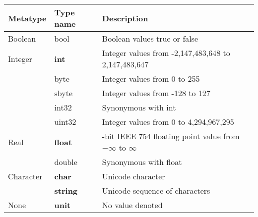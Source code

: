 \begin{table}
  \centering
  \begin{tabularx}{\textwidth}{|l|l|>{\raggedright\arraybackslash}X|}
    \hline
    Metatype & Type name & Description\\
    \hline
    Boolean & bool & Boolean values true or false \\
    \hline
    Integer & \textbf{int} & Integer values from -2,147,483,648 to 2,147,483,647 \\
             & byte &Integer values from 0 to 255\\
             & sbyte &Integer values from -128 to 127\\
             & int32 &Synonymous with int\\
             & uint32 & Integer values from 0 to 4,294,967,295\\
    \hline
    Real &\textbf{float} & 64-bit IEEE 754 floating point value from $-\infty$ to $\infty$\\
             & double & Synonymous with float\\
    \hline
    Character &\textbf{char} &Unicode character\\
             &\textbf{string} & Unicode sequence of characters\\
    \hline
    None &\textbf{unit} & No value denoted\\

\end{tabularx}
\end{table}
